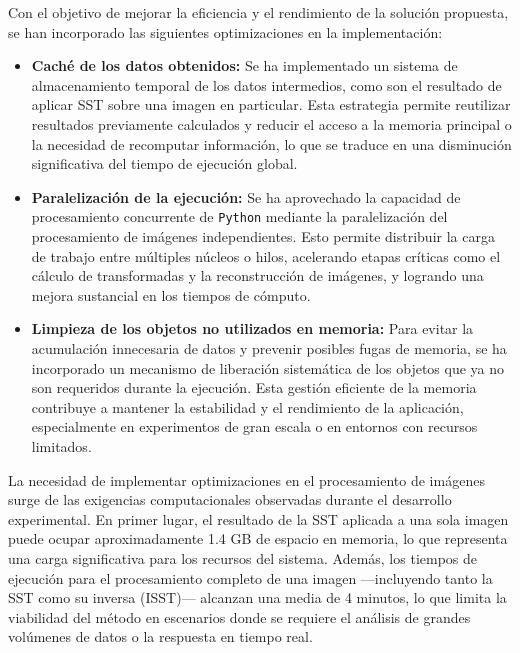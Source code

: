 Con el objetivo de mejorar la eficiencia y el rendimiento de la solución propuesta, se han incorporado las siguientes optimizaciones en la implementación:

\begin{itemize}
    \item \textbf{Caché de los datos obtenidos:} Se ha implementado un sistema de almacenamiento temporal de los datos intermedios, como son el resultado de aplicar SST sobre una imagen en particular. Esta estrategia permite reutilizar resultados previamente calculados y reducir el acceso a la memoria principal o la necesidad de recomputar información, lo que se traduce en una disminución significativa del tiempo de ejecución global.
    
    \item \textbf{Paralelización de la ejecución:} Se ha aprovechado la capacidad de procesamiento concurrente de \texttt{Python} mediante la paralelización del procesamiento de imágenes independientes. Esto permite distribuir la carga de trabajo entre múltiples núcleos o hilos, acelerando etapas críticas como el cálculo de transformadas y la reconstrucción de imágenes, y logrando una mejora sustancial en los tiempos de cómputo.
    
    \item \textbf{Limpieza de los objetos no utilizados en memoria:} Para evitar la acumulación innecesaria de datos y prevenir posibles fugas de memoria, se ha incorporado un mecanismo de liberación sistemática de los objetos que ya no son requeridos durante la ejecución. Esta gestión eficiente de la memoria contribuye a mantener la estabilidad y el rendimiento de la aplicación, especialmente en experimentos de gran escala o en entornos con recursos limitados.
\end{itemize}

La necesidad de implementar optimizaciones en el procesamiento de imágenes surge de las exigencias computacionales observadas durante el desarrollo experimental. En primer lugar, el resultado de la SST aplicada a una sola imagen puede ocupar aproximadamente 1.4 GB de espacio en memoria, lo que representa una carga significativa para los recursos del sistema. Además, los tiempos de ejecución para el procesamiento completo de una imagen —incluyendo tanto la SST como su inversa (ISST)— alcanzan una media de 4 minutos, lo que limita la viabilidad del método en escenarios donde se requiere el análisis de grandes volúmenes de datos o la respuesta en tiempo real.

